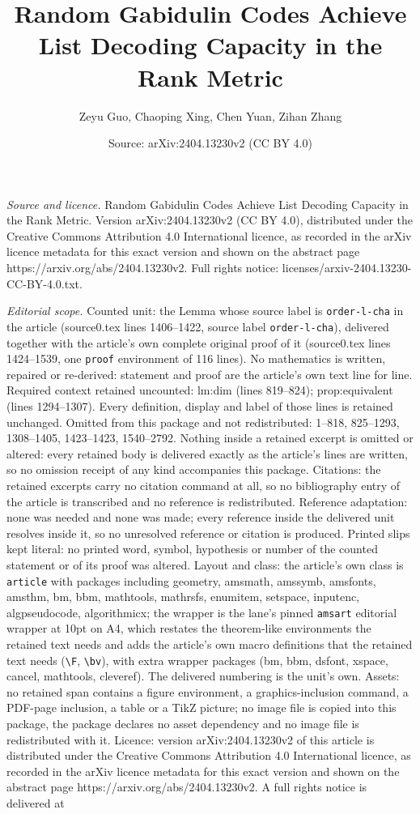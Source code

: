 \documentclass[10pt,a4paper]{amsart}
\title[Random Gabidulin Codes Achieve List Decoding Capacity in the]{Random Gabidulin Codes Achieve List Decoding Capacity in the Rank Metric}
\author{Zeyu Guo, Chaoping Xing, Chen Yuan, Zihan Zhang}
\date{Source: arXiv:2404.13230v2 (CC BY 4.0)}
\begin{document}
\maketitle

\noindent\emph{Source and licence.} Random Gabidulin Codes Achieve List Decoding Capacity in the Rank Metric. Version arXiv:2404.13230v2 (CC BY 4.0), distributed under the Creative Commons Attribution 4.0 International licence, as recorded in the arXiv licence metadata for this exact version and shown on the abstract page https://arxiv.org/abs/2404.13230v2. Full rights notice: licenses/arxiv-2404.13230-CC-BY-4.0.txt.\par\smallskip

\noindent\textit{Editorial scope.} Counted unit: the Lemma whose source label is \texttt{order-l-cha} in the article (source0.tex lines 1406--1422, source label \texttt{order-l-cha}), delivered together with the article's own complete original proof of it (source0.tex lines 1424--1539, one \texttt{proof} environment of 116 lines). No mathematics is written, repaired or re-derived: statement and proof are the article's own text line for line. Required context retained uncounted: lm:dim (lines 819--824); prop:equivalent (lines 1294--1307). Every definition, display and label of those lines is retained unchanged. Omitted from this package and not redistributed: 1--818, 825--1293, 1308--1405, 1423--1423, 1540--2792. Nothing inside a retained excerpt is omitted or altered: every retained body is delivered exactly as the article's lines are written, so no omission receipt of any kind accompanies this package. Citations: the retained excerpts carry no citation command at all, so no bibliography entry of the article is transcribed and no reference is redistributed. Reference adaptation: none was needed and none was made; every reference inside the delivered unit resolves inside it, so no unresolved reference or citation is produced. Printed slips kept literal: no printed word, symbol, hypothesis or number of the counted statement or of its proof was altered. Layout and class: the article's own class is \texttt{article} with packages including geometry, amsmath, amssymb, amsfonts, amsthm, bm, bbm, mathtools, mathrsfs, enumitem, setspace, inputenc, algpseudocode, algorithmicx; the wrapper is the lane's pinned \texttt{amsart} editorial wrapper at 10pt on A4, which restates the theorem-like environments the retained text needs and adds the article's own macro definitions that the retained text needs (\texttt{\textbackslash F}, \texttt{\textbackslash bv}), with extra wrapper packages (bm, bbm, dsfont, xspace, cancel, mathtools, cleveref). The delivered numbering is the unit's own. Assets: no retained span contains a figure environment, a graphics-inclusion command, a PDF-page inclusion, a table or a TikZ picture; no image file is copied into this package, the package declares no asset dependency and no image file is redistributed with it. Licence: version arXiv:2404.13230v2 of this article is distributed under the Creative Commons Attribution 4.0 International licence, as recorded in the arXiv licence metadata for this exact version and shown on the abstract page https://arxiv.org/abs/2404.13230v2. A full rights notice is delivered at 
\end{document}
